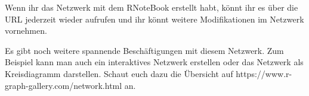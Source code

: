 \documentclass[11pt]{article}
\begin{document}
Wenn ihr das Netzwerk mit dem RNoteBook erstellt habt, könnt ihr es über
die URL jederzeit wieder aufrufen und ihr könnt weitere Modifikationen
im Netzwerk vornehmen.

Es gibt noch weitere spannende Beschäftigungen mit diesem Netzwerk. Zum
Beispiel kann man auch ein interaktives Netzwerk erstellen oder das
Netzwerk als Kreisdiagramm darstellen. Schaut euch dazu die Übersicht
auf https://www.r-graph-gallery.com/network.html an.


    
    
    
\end{document}
